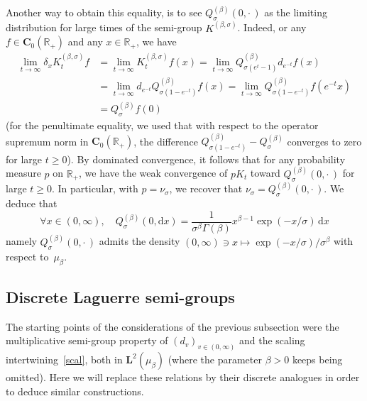 \documentclass[AHL,Unicode,longabstracts]{cedram}
\newcommand{\RR}{\mathbb{R}}
\newcommand{\iy}{\infty}
\newcommand{\ri}{\rightarrow}
\newcommand{\esL}{\mathbf{L}}
\newcommand{\esC}{\mathbf{C}}
\let\oldforall\forall
\renewcommand*{\forall}{\mathrel{\oldforall}}
\newcommand*{\dd}{\mathrm{d}}
\newcommand*{\dx}{\dd x}
\begin{document}
\begin{rema}
Another way to obtain this equality, is to see $Q^{(\beta)}_{\sigma}(0,{\cdot\,})$ as the limiting distribution for large times of the semi-group $K^{(\beta,\sigma)}$. Indeed, or any $f\in\esC_0(\RR_+)$ and any $x\in \RR_+$, we have
\begin{align*}
\lim_{t\ri\iy }
\delta_x K_t^{(\beta,\sigma)}f&=
\lim_{t\ri\iy }K_t^{(\beta,\sigma)}f(x)=\lim_{t\ri\iy }Q^{(\beta)}_{\sigma(e^{t}-1)}d_{e^{-t}}f(x)\\
&=\lim_{t\ri\iy }d_{e^{-t}}Q^{(\beta)}_{\sigma(1-e^{-t})}f(x) =\lim_{t\ri\iy }Q^{(\beta)}_{\sigma(1-e^{-t})}f(e^{-t}x)\\
&=Q^{(\beta)}_\sigma f(0)
\end{align*}
(for the penultimate equality, we used that with respect to the operator supremum norm in $\esC_0(\RR_+)$, the difference $Q^{(\beta)}_{\sigma(1-e^{-t})}-Q^{(\beta)}_\sigma$ converges to zero for large $t\geq 0$). By dominated convergence, it follows that for any probability measure $p$ on $\RR_+$, we have the weak convergence of $pK_t$ toward $Q^{(\beta)}_{\sigma}(0,{\cdot\,})$ for large $t\geq 0$. In particular, with $p=\nu_{\sigma}$, we recover that $\nu_{\sigma}=Q^{(\beta)}_{\sigma}(0,{\cdot\,})$. We deduce that
\[
\forall x\in(0,\iy),\quad Q^{(\beta)}_{\sigma}(0,\dx)= \frac{1}{\sigma^{\beta}\Gamma(\beta)}x^{\beta-1}\exp(-x/\sigma)\, \dx
\]
namely $Q^{(\beta)}_{\sigma}(0,{\cdot\,})$ admits the density $(0,\iy)\ni x\mapsto \exp(-x/\sigma)/\sigma^{\beta}$ with respect to~$\mu_{\beta}$.
\end{rema}

\subsection{Discrete Laguerre semi-groups}\label{dLp}

The starting points of the considerations of the previous subsection were the multiplicative semi-group property of $(d_v)_{v\in(0,\iy)}$ and the scaling intertwining~\eqref{scal}, both in $\esL^2(\mu_{\beta})$ (where the parameter $\beta>0$ keeps being omitted). Here we will replace these relations by their discrete analogues in order to deduce similar constructions.
\end{document}
